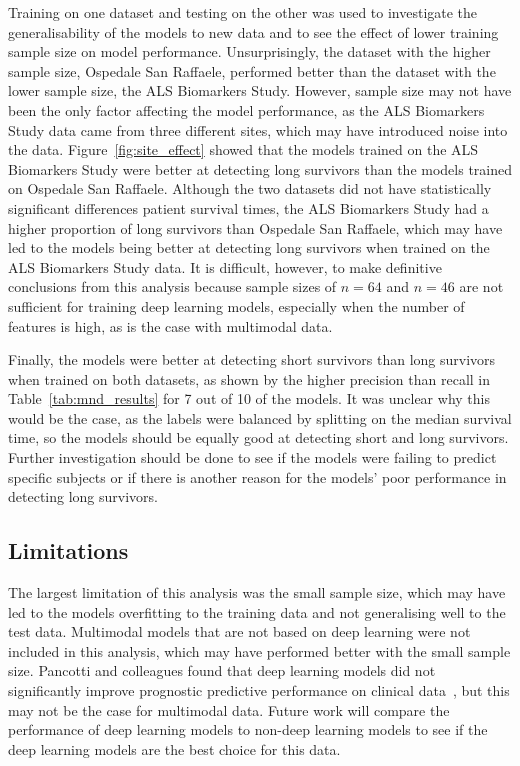 Training on one dataset and testing on the other was used to investigate the generalisability of the models to new data and to see the effect of lower training sample size on model performance.
Unsurprisingly, the dataset with the higher sample size, Ospedale San Raffaele, performed better than the dataset with the lower sample size, the ALS Biomarkers Study.
However, sample size may not have been the only factor affecting the model performance, as the ALS Biomarkers Study data came from three different sites, which may have introduced noise into the data.
Figure~\ref{fig:site_effect} showed that the models trained on the ALS Biomarkers Study were better at detecting long survivors than the models trained on Ospedale San Raffaele.
Although the two datasets did not have statistically significant differences patient survival times, the ALS Biomarkers Study had a higher proportion of long survivors than Ospedale San Raffaele, which may have led to the models being better at detecting long survivors when trained on the ALS Biomarkers Study data.
It is difficult, however, to make definitive conclusions from this analysis because sample sizes of $n=64$ and $n=46$ are not sufficient for training deep learning models, especially when the number of features is high, as is the case with multimodal data.

Finally, the models were better at detecting short survivors than long survivors when trained on both datasets, as shown by the higher precision than recall in Table~\ref{tab:mnd_results} for 7 out of 10 of the models.
It was unclear why this would be the case, as the labels were balanced by splitting on the median survival time, so the models should be equally good at detecting short and long survivors.
Further investigation should be done to see if the models were failing to predict specific subjects or if there is another reason for the models' poor performance in detecting long survivors.

\subsection{Limitations}
The largest limitation of this analysis was the small sample size, which may have led to the models overfitting to the training data and not generalising well to the test data.
Multimodal models that are not based on deep learning were not included in this analysis, which may have performed better with the small sample size.
Pancotti and colleagues found that deep learning models did not significantly improve prognostic predictive performance on clinical data~\cite{pancottiDeepLearningMethods2022}, but this may not be the case for multimodal data.
Future work will compare the performance of deep learning models to non-deep learning models to see if the deep learning models are the best choice for this data.

